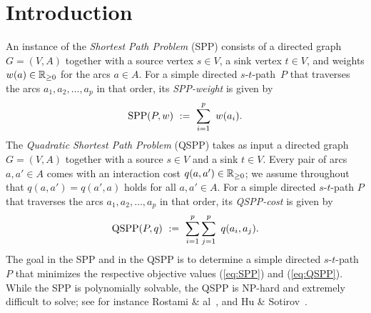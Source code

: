 \documentclass[runningheads]{llncs}
\begin{document}
\section{Introduction}
An instance of the \emph{Shortest Path Problem} (SPP) consists of a directed graph $G=(V,A)$ 
together with a source vertex $s\in V$, a sink vertex $t\in V$, and weights $w(a)\in{\mathbb{R}_{\ge0}}$ 
for the arcs $a\in A$.
For a simple directed $s$-$t$-path~$P$ that traverses the arcs $a_1,a_2,\ldots,a_p$ in that order,
its \emph{SPP-weight} is given by
\begin{equation}
\label{eq:SPP}
\text{SPP}(P,w) ~:=~ \sum_{i=1}^p~ w(a_i).
\end{equation}
The \emph{Quadratic Shortest Path Problem} (QSPP) takes as input a directed graph $G=(V,A)$ together
with a source $s\in V$ and a sink $t\in V$.
Every pair of arcs $a,a'\in A$ comes with an interaction cost $q(a,a')\in{\mathbb{R}_{\ge0}}$;
we assume throughout that $q(a,a')=q(a',a)$ holds for all $a,a'\in A$.
For a simple directed $s$-$t$-path $P$ that traverses the arcs $a_1,a_2,\ldots,a_p$ in that order,
its \emph{QSPP-cost} is given by 
\begin{equation}
\label{eq:QSPP}
\text{QSPP}(P,q) ~:=~ \sum_{i=1}^p\sum_{j=1}^p~ q(a_i,a_j).
\end{equation}
The goal in the SPP and in the QSPP is to determine a simple directed $s$-$t$-path $P$ that 
minimizes the respective objective values (\ref{eq:SPP}) and (\ref{eq:QSPP}).
While the SPP is polynomially solvable, the QSPP is NP-hard and extremely difficult to solve;
see for instance Rostami \& al~\cite{Rostami-2}, and Hu \& Sotirov~\cite{HuSo2018a,HuSo2018b,HuSo2020}.
\end{document}

